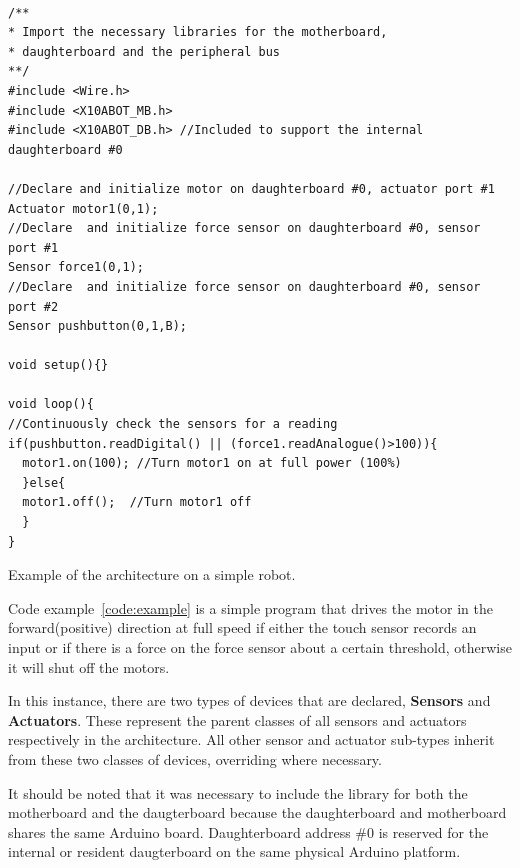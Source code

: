 	\begin{listing}[H]
		\footnotesize
		\begin{verbatim}

/**
* Import the necessary libraries for the motherboard, 
* daughterboard and the peripheral bus
**/
#include <Wire.h>  
#include <X10ABOT_MB.h>
#include <X10ABOT_DB.h> //Included to support the internal daughterboard #0

//Declare and initialize motor on daughterboard #0, actuator port #1
Actuator motor1(0,1);
//Declare  and initialize force sensor on daughterboard #0, sensor port #1
Sensor force1(0,1);
//Declare  and initialize force sensor on daughterboard #0, sensor port #2
Sensor pushbutton(0,1,B);

void setup(){}

void loop(){
//Continuously check the sensors for a reading
if(pushbutton.readDigital() || (force1.readAnalogue()>100)){
  motor1.on(100); //Turn motor1 on at full power (100%) 
  }else{
  motor1.off();  //Turn motor1 off
  }
}	 

		\end{verbatim}
		\caption{Example of the \xten architecture on a simple robot.} \label{code:example}
	\end{listing}



Code example~\ref{code:example} is a simple program that drives the motor in the forward(positive) direction at full speed if either the touch sensor records an input or if there is a force on the force sensor about a certain threshold, otherwise it will shut off the motors.

In this instance, there are two types of devices that are declared, \textbf{Sensors} and \textbf{Actuators}. These represent the parent classes of all sensors and actuators respectively in the \xten architecture. All other sensor and actuator sub-types inherit from these two classes of devices, overriding where necessary.

It should be noted that it was necessary to include the library for both the motherboard and the daugterboard because the daughterboard and motherboard shares the same Arduino board. Daughterboard address \#0 is reserved for the internal or resident daugterboard on the same physical Arduino platform.

